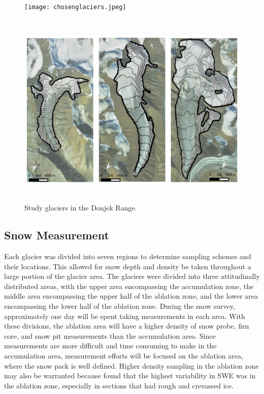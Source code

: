 \documentclass[12pt]{article}
\begin{document}
\begin{figure}
  \begin{minipage}[c][22cm][t]{\textwidth}
        \vspace*{\fill}
  \centering
  \texttt{[image: chosenglaciers.jpeg]}
  \par\vfill
  \includegraphics[height=9.5cm]{threeglaciers.jpeg}
\end{minipage}%
\caption{Study glaciers in the Donjek Range.}
\label{donjek}
\end{figure}

\subsection{Snow Measurement} 

Each glacier was divided into seven regions to determine sampling schemes and their locations. This allowed for snow depth and density be taken throughout a large portion of the glacier area. The glaciers were divided into three attitudinally distributed areas, with the upper area encompassing the accumulation zone, the middle area encompassing the upper half of the ablation zone, and the lower area encompassing the lower half of the ablation zone. During the snow survey, approximately one day will be spent taking measurements in each area. With these divisions, the ablation area will have a higher density of snow probe, firn core, and snow pit measurements than the accumulation area. Since measurements are more difficult and time consuming to make in the accumulation area, measurement efforts will be focused on the ablation area, where the snow pack is well defined. Higher density sampling in the ablation zone may also be warranted because \cite{McGrath2015} found that the highest variability in SWE was in the ablation zone, especially in sections that had rough and crevassed ice.
\end{document}
